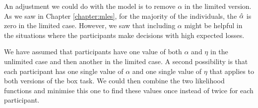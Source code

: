 


An adjustment we could do with the model is to remove $\alpha$ in the limited version. As we saw in Chapter \ref{chapter:mles},
for the majority of the individuals, the $\hat{\alpha}$ is zero in the limited case. However, we saw that including $\alpha$ might be helpful in the situations where the participants make decisions with high expected losses. 

We have assumed that participants have one value of both $\alpha$ and $\eta$ in the unlimited case and then another in the limited case. A second possibility is that each participant has one single value of $\alpha$ and one single value of $\eta$ that applies to both versions of the box task. We could then combine the two likelihood functions and minimise this one to find these values once instead of twice for each participant. 

